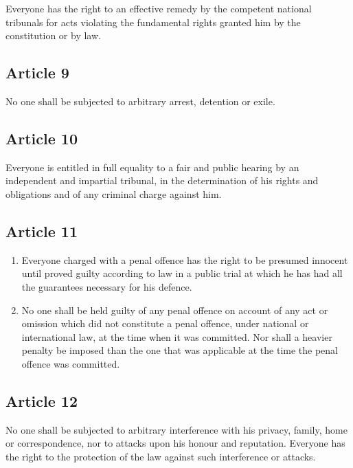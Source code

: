 \documentclass[
  titlepage,
  openright,
  DIV=calc,
  toc=listof,
  listof=nochaptergap]{scrbook}
\begin{document}
Everyone has the right to an effective remedy by the competent national
tribunals for acts violating the fundamental rights granted him by the
constitution or by law.

\hypertarget{article-9}{%
\subsection{Article 9}\label{article-9}}

No one shall be subjected to arbitrary arrest, detention or exile.

\hypertarget{article-10}{%
\subsection{Article 10}\label{article-10}}

Everyone is entitled in full equality to a fair and public hearing by an
independent and impartial tribunal, in the determination of his rights
and obligations and of any criminal charge against him.

\hypertarget{article-11}{%
\subsection{Article 11}\label{article-11}}

\begin{enumerate}
\def\labelenumi{\arabic{enumi}.}
\item
  Everyone charged with a penal offence has the right to be presumed
  innocent until proved guilty according to law in a public trial at
  which he has had all the guarantees necessary for his defence.
\item
  No one shall be held guilty of any penal offence on account of any act
  or omission which did not constitute a penal offence, under national
  or international law, at the time when it was committed. Nor shall a
  heavier penalty be imposed than the one that was applicable at the
  time the penal offence was committed.
\end{enumerate}

\hypertarget{article-12}{%
\subsection{Article 12}\label{article-12}}

No one shall be subjected to arbitrary interference with his privacy,
family, home or correspondence, nor to attacks upon his honour and
reputation. Everyone has the right to the protection of the law against
such interference or attacks.
\end{document}
